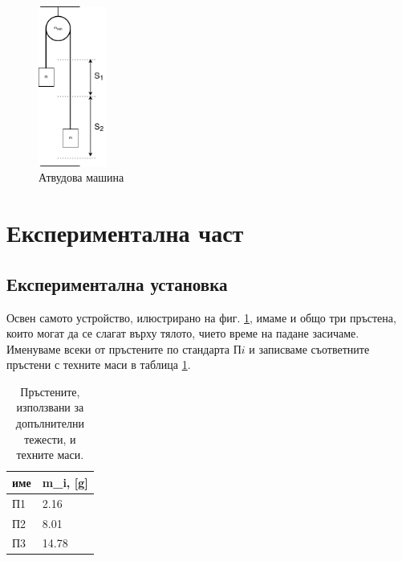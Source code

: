 \documentclass[12pt]{article}
\begin{document}
\begin{figure}
    \centering
    \includegraphics[width=0.2\textwidth]{images/atwood-machine.drawio.png}
    \caption{Атвудова машина}
    \label{fig:device}
\end{figure}

\section{Експериментална част}
\subsection{Експериментална установка}
Освен самото устройство, илюстрирано на фиг. \ref{fig:device}, имаме и общо три пръстена, които могат да се слагат върху тялото, чието време на падане засичаме. Именуваме всеки от пръстените по стандарта П$i$ и записваме съответните пръстени с техните маси в таблица \ref{tbl:rings}. 

\begin{table}[h]
\begin{center}
\begin{tabular}{|l|l|}\hline
име & m_i, [g] \\ \hline
П1 &2.16 \\ \hline
П2 &8.01 \\ \hline
П3 &14.78 \\ \hline
\end{tabular}
\caption{\label{tbl:rings}Пръстените, използвани за допълнителни тежести, и техните маси.}
\end{center}
\end{table}
\end{document}
